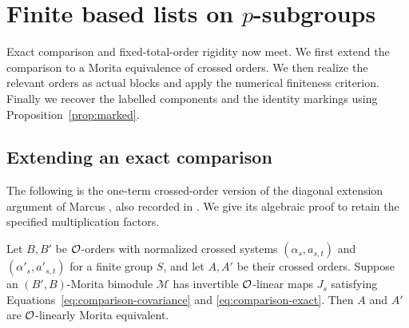 \section{Finite based lists on \texorpdfstring{$p$}{p}-subgroups}\label{sec:sylow}

Exact comparison and fixed-total-order rigidity now meet.  We first
extend the comparison to a Morita equivalence of crossed orders.  We
then realize the relevant orders as actual blocks and apply the
numerical finiteness criterion.  Finally we recover the labelled
components and the identity markings using
Proposition~\ref{prop:marked}.

\subsection{Extending an exact comparison}

The following is the one-term crossed-order version of the
diagonal extension argument of Marcus
\cite[Theorem~3.4]{Marcus1996}, also recorded in
\cite[Lemma~10.2.8]{Rouquier1998}.  We give its algebraic
proof to retain the specified multiplication factors.

\begin{lemma}\label{lem:induced}
Let $B,B'$ be $\mathcal O$-orders with normalized crossed systems
$(\alpha_s,a_{s,t})$ and $(\alpha'_s,a'_{s,t})$ for a finite group
$S$, and let $A,A'$ be their crossed orders.  Suppose an
$(B',B)$-Morita bimodule $\mathcal M$ has invertible
$\mathcal O$-linear maps $J_s$ satisfying
Equations~\eqref{eq:comparison-covariance} and
\eqref{eq:comparison-exact}.  Then $A$ and $A'$ are
$\mathcal O$-linearly Morita equivalent.
\end{lemma}

